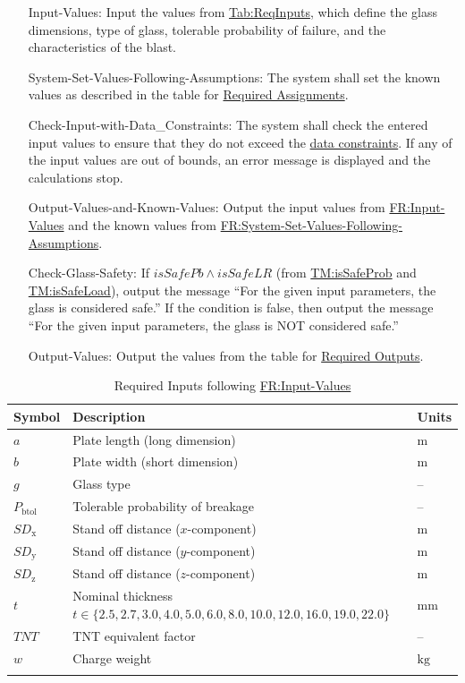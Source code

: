 \documentclass[12pt]{article}
\begin{document}
\begin{itemize}
\item[Input-Values:\phantomsection\label{inputValues}]{Input the values from \hyperref[Table:ReqInputs]{Tab:ReqInputs}, which define the glass dimensions, type of glass, tolerable probability of failure, and the characteristics of the blast.}
\item[System-Set-Values-Following-Assumptions:\phantomsection\label{sysSetValsFollowingAssumps}]{The system shall set the known values as described in the table for \hyperref[Table:ReqAssignments]{Required Assignments}.}
\item[Check-Input-with-Data\_Constraints:\phantomsection\label{checkInputWithDataCons}]{The system shall check the entered input values to ensure that they do not exceed the \hyperref[Sec:DataConstraints]{data constraints}. If any of the input values are out of bounds, an error message is displayed and the calculations stop.}
\item[Output-Values-and-Known-Values:\phantomsection\label{outputValsAndKnownValues}]{Output the input values from \hyperref[inputValues]{FR:Input-Values} and the known values from \hyperref[sysSetValsFollowingAssumps]{FR:System-Set-Values-Following-Assumptions}.}
\item[Check-Glass-Safety:\phantomsection\label{checkGlassSafety}]{If $\mathit{isSafePb}\land{}\mathit{isSafeLR}$ (from \hyperref[TM:isSafeProb]{TM:isSafeProb} and \hyperref[TM:isSafeLoad]{TM:isSafeLoad}), output the message ``For the given input parameters, the glass is considered safe.'' If the condition is false, then output the message ``For the given input parameters, the glass is NOT considered safe.''}
\item[Output-Values:\phantomsection\label{outputValues}]{Output the values from the table for \hyperref[Table:ReqOutputs]{Required Outputs}.}
\end{itemize}
\begin{longtabu}{l X[l] l}
\toprule
\textbf{Symbol} & \textbf{Description} & \textbf{Units}
\\
\midrule
\endhead
$a$ & Plate length (long dimension) & ${\text{m}}$
\\
$b$ & Plate width (short dimension) & ${\text{m}}$
\\
$g$ & Glass type & --
\\
${P_{\text{b}\text{tol}}}$ & Tolerable probability of breakage & --
\\
${\mathit{SD}_{\text{x}}}$ & Stand off distance ($x$-component) & ${\text{m}}$
\\
${\mathit{SD}_{\text{y}}}$ & Stand off distance ($y$-component) & ${\text{m}}$
\\
${\mathit{SD}_{\text{z}}}$ & Stand off distance ($z$-component) & ${\text{m}}$
\\
$t$ & Nominal thickness $t\in{}\{2.5,2.7,3.0,4.0,5.0,6.0,8.0,10.0,12.0,16.0,19.0,22.0\}$ & ${\text{mm}}$
\\
$\mathit{TNT}$ & TNT equivalent factor & --
\\
$w$ & Charge weight & ${\text{kg}}$
\\
\bottomrule
\caption{Required Inputs following \hyperref[inputValues]{FR:Input-Values}}
\label{Table:ReqInputs}
\end{longtabu}
\end{document}
